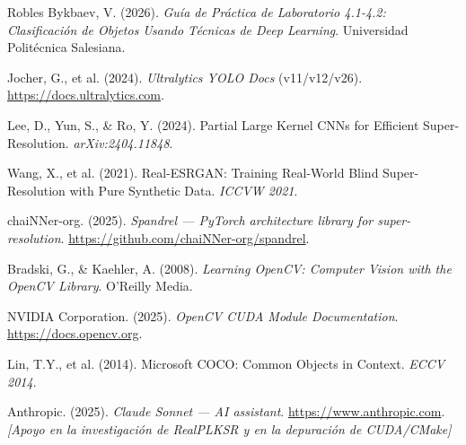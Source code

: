 \documentclass[12pt,a4paper]{article}
\begin{document}
\begin{enumerate}[label={[\arabic*]}]
  \item Robles Bykbaev, V. (2026). \textit{Guía de Práctica de Laboratorio 4.1-4.2: Clasificación de Objetos Usando Técnicas de Deep Learning}. Universidad Politécnica Salesiana.

  \item Jocher, G., et al. (2024). \textit{Ultralytics YOLO Docs} (v11/v12/v26). \url{https://docs.ultralytics.com}.

  \item Lee, D., Yun, S., \& Ro, Y. (2024). Partial Large Kernel CNNs for Efficient Super-Resolution. \textit{arXiv:2404.11848}.

  \item Wang, X., et al. (2021). Real-ESRGAN: Training Real-World Blind Super-Resolution with Pure Synthetic Data. \textit{ICCVW 2021}.

  \item chaiNNer-org. (2025). \textit{Spandrel — PyTorch architecture library for super-resolution}. \url{https://github.com/chaiNNer-org/spandrel}.

  \item Bradski, G., \& Kaehler, A. (2008). \textit{Learning OpenCV: Computer Vision with the OpenCV Library}. O'Reilly Media.

  \item NVIDIA Corporation. (2025). \textit{OpenCV CUDA Module Documentation}. \url{https://docs.opencv.org}.

  \item Lin, T.Y., et al. (2014). Microsoft COCO: Common Objects in Context. \textit{ECCV 2014}.

  \item Anthropic. (2025). \textit{Claude Sonnet — AI assistant}. \url{https://www.anthropic.com}. \textit{[Apoyo en la investigación de RealPLKSR y en la depuración de CUDA/CMake]}
\end{enumerate}
\end{document}
